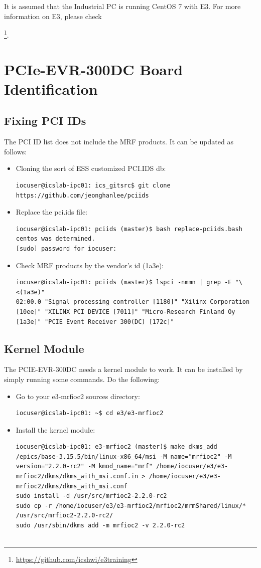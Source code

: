 \documentclass[11pt
  , a4paper
  , article
  , oneside
  , showtrims
]{memoir}
\begin{document}
It is assumed that the Industrial PC is running CentOS 7 with E3. For more information on E3, please check {\footnote{\url{https://github.com/icshwi/e3training}}.


\section{PCIe-EVR-300DC Board Identification}

\subsection{Fixing PCI IDs}
The PCI ID list does not include the MRF products. It can be updated as follows:
\begin{itemize}
\item Cloning the sort of ESS customized PCI.IDS db:
\begin{lstlisting}[style=termstyle]
iocuser@icslab-ipc01: ics_gitsrc$ git clone https://github.com/jeonghanlee/pciids
\end{lstlisting}
\item Replace the pci.ids file:
\begin{lstlisting}[style=termstyle]
iocuser@icslab-ipc01: pciids (master)$ bash replace-pciids.bash
centos was determined.
[sudo] password for iocuser:
\end{lstlisting}
\item Check MRF products by the vendor's id (1a3e):
\begin{lstlisting}[style=termstyle]
iocuser@icslab-ipc01: pciids (master)$ lspci -nmmn | grep -E "\<(1a3e)"
02:00.0 "Signal processing controller [1180]" "Xilinx Corporation [10ee]" "XILINX PCI DEVICE [7011]" "Micro-Research Finland Oy [1a3e]" "PCIE Event Receiver 300(DC) [172c]"
\end{lstlisting}
\end{itemize}

\subsection{Kernel Module}
The PCIE-EVR-300DC needs a kernel module to work. It can be installed by simply running some commands. Do the following:
\begin{itemize}
\item Go to your e3-mrfioc2 sources directory:
\begin{lstlisting}[style=termstyle]
iocuser@icslab-ipc01: ~$ cd e3/e3-mrfioc2
\end{lstlisting}
\item Install the kernel module:
\begin{lstlisting}[style=termstyle]
iocuser@icslab-ipc01: e3-mrfioc2 (master)$ make dkms_add
/epics/base-3.15.5/bin/linux-x86_64/msi -M name="mrfioc2" -M  version="2.2.0-rc2" -M kmod_name="mrf" /home/iocuser/e3/e3-mrfioc2/dkms/dkms_with_msi.conf.in > /home/iocuser/e3/e3-mrfioc2/dkms/dkms_with_msi.conf
sudo install -d /usr/src/mrfioc2-2.2.0-rc2
sudo cp -r /home/iocuser/e3/e3-mrfioc2/mrfioc2/mrmShared/linux/* /usr/src/mrfioc2-2.2.0-rc2/
sudo /usr/sbin/dkms add -m mrfioc2 -v 2.2.0-rc2


\end{lstlisting}
\end{itemize}}
\end{document}
